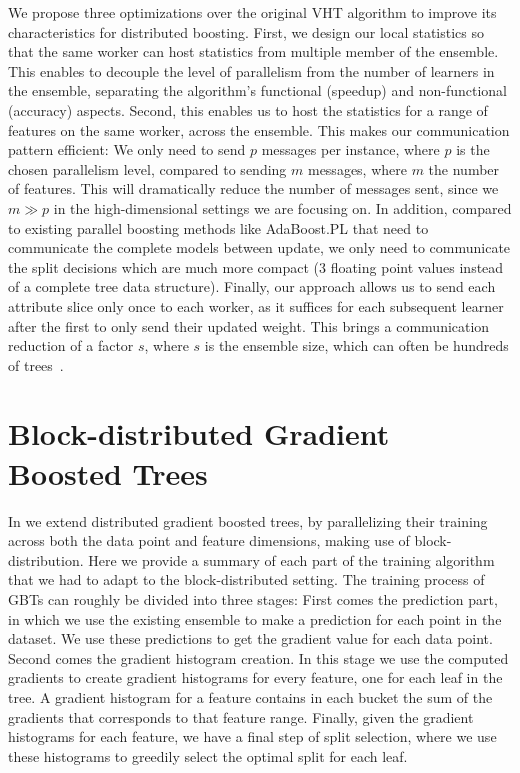 We propose three optimizations over the original VHT algorithm to improve its
characteristics for distributed boosting. First, we design our local statistics
so that the same worker can host statistics from multiple member of the ensemble.
This enables to decouple the level of parallelism from the number of learners
in the ensemble, separating the algorithm's functional (speedup) and non-functional
(accuracy) aspects.
Second, this enables us to host the statistics for a range of features on the same
worker, across the ensemble. This makes our communication pattern efficient:
We only need to send $p$  messages per instance, where $p$ is the chosen
parallelism level, compared to sending $m$ messages, where $m$ the
number of features. This will dramatically
reduce the number of messages sent, since we $m \gg p$ in the high-dimensional
settings we are focusing on. In addition, compared to existing
parallel boosting methods like AdaBoost.PL \cite{adaboost-pl} that need to communicate the complete
models between update, we only need to communicate the split decisions which are
much more compact (3 floating point values instead of a complete tree data structure).
Finally, our approach allows us to send each attribute slice only once to
each worker, as it suffices for each subsequent learner after the first
to only send their updated weight. This brings a communication reduction
of a factor $s$, where $s$ is the ensemble size, which can often be hundreds of
trees~\cite{hundreds-classifiers}.

\section{Block-distributed Gradient Boosted Trees}
\label{sec:block-gbt}

In \blockgbt we extend distributed gradient boosted trees, by parallelizing their
training across both the data point and feature dimensions, making use of block-distribution.
Here we provide a summary of each part of the training algorithm that we had to
adapt to the block-distributed setting.
The training process of GBTs can roughly be divided into three stages: First comes
the prediction part, in which we use the existing ensemble to make a prediction
for each point in the dataset. We use these predictions to get the gradient
value for each data point. Second comes the gradient histogram creation.
In this stage we use the computed gradients to create gradient histograms
for every feature, one for each leaf in the tree. A gradient histogram
for a feature contains in each bucket the sum of the gradients that corresponds to
that feature range. Finally, given the gradient histograms for each feature,
we have a final step of split selection, where we use these histograms to greedily
select the optimal split for each leaf.

